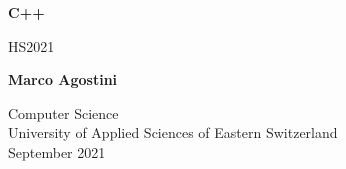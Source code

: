 \begin{titlepage}
    \begin{center}
        \vspace*{1cm}
            
        \Huge
        \textbf{C++}
            
        \vspace{0.5cm}
        \LARGE
        HS2021
            
        \vspace{1.5cm}
            
        \textbf{Marco Agostini}
            
        \vfill
            
            
        \vspace{0.8cm}
            
            
        \Large
        Computer Science\\
        University of Applied Sciences of Eastern Switzerland\\
        September 2021
        

    \end{center}
\end{titlepage}

\tableofcontents
